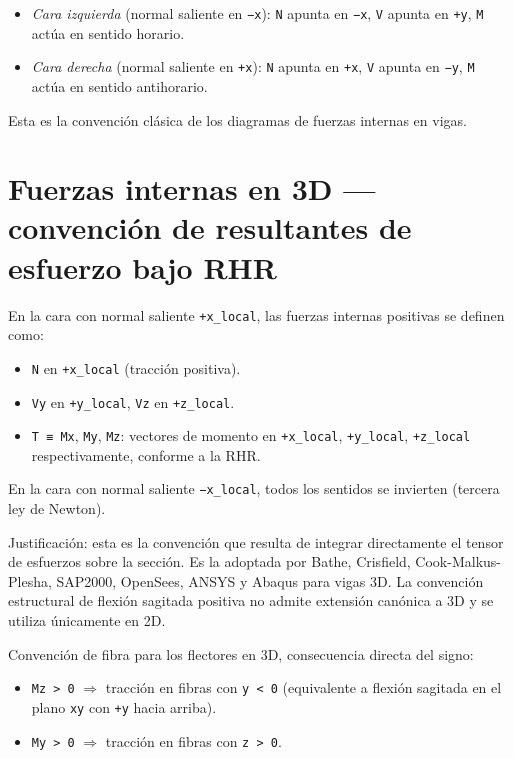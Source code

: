 \documentclass[11pt,oneside]{report}
\begin{document}
\begin{itemize}
  \item \textit{Cara izquierda} (normal saliente en \texttt{−x}): \texttt{N} apunta en \texttt{−x}, \texttt{V} apunta en \texttt{+y}, \texttt{M} actúa en sentido horario.
  \item \textit{Cara derecha} (normal saliente en \texttt{+x}): \texttt{N} apunta en \texttt{+x}, \texttt{V} apunta en \texttt{−y}, \texttt{M} actúa en sentido antihorario.
\end{itemize}

Esta es la convención clásica de los diagramas de fuerzas internas en vigas.

\section{Fuerzas internas en 3D --- convención de resultantes de esfuerzo bajo RHR}

En la cara con normal saliente \texttt{+x\_local}, las fuerzas internas positivas se definen como:

\begin{itemize}
  \item \texttt{N} en \texttt{+x\_local} (tracción positiva).
  \item \texttt{Vy} en \texttt{+y\_local}, \texttt{Vz} en \texttt{+z\_local}.
  \item \texttt{T ≡ Mx}, \texttt{My}, \texttt{Mz}: vectores de momento en \texttt{+x\_local}, \texttt{+y\_local}, \texttt{+z\_local} respectivamente, conforme a la RHR.
\end{itemize}

En la cara con normal saliente \texttt{−x\_local}, todos los sentidos se invierten (tercera ley de Newton).

Justificación: esta es la convención que resulta de integrar directamente el tensor de esfuerzos sobre la sección. Es la adoptada por Bathe, Crisfield, Cook-Malkus-Plesha, SAP2000, OpenSees, ANSYS y Abaqus para vigas 3D. La convención estructural de \textquotedbl{}flexión sagitada positiva\textquotedbl{} no admite extensión canónica a 3D y se utiliza únicamente en 2D.

Convención de fibra para los flectores en 3D, consecuencia directa del signo:

\begin{itemize}
  \item \texttt{Mz \textgreater{} 0} \ensuremath{\Rightarrow} tracción en fibras con \texttt{y \textless{} 0} (equivalente a flexión sagitada en el plano \texttt{xy} con \texttt{+y} hacia arriba).
  \item \texttt{My \textgreater{} 0} \ensuremath{\Rightarrow} tracción en fibras con \texttt{z \textgreater{} 0}.
\end{itemize}
\end{document}
